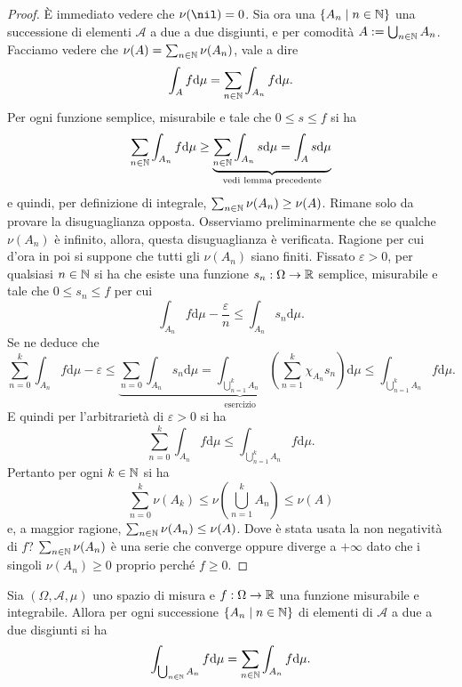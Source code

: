 \begin{proof}
È immediato vedere che \(\nu(\nil) = 0\). Sia ora una \(\left\{A_n \mid n \in \mathbb N\right\}\) una successione di elementi \(\mathcal A\) a due a due disgiunti, e per comodità \(A := \bigcup_{n \in \mathbb N} A_n\). Facciamo vedere che \(\nu (A) = \sum_{n \in \mathbb N} \nu(A_n)\), vale a dire 
\[\int_A f \mathrm d \mu = \sum_{n \in \mathbb N} \int_{A_n} f \mathrm d \mu .\]
Per ogni funzione semplice, misurabile e tale che \(0 \le s \le f\) si ha
\[\sum_{n \in \mathbb N} \int_{A_n} f \mathrm d \mu \ge \underbrace{\sum_{n \in \mathbb N} \int_{A_n} s \mathrm d \mu = \int_A s \mathrm d \mu}_{\text{vedi lemma precedente}}\]
e quindi, per definizione di integrale, \(\sum_{n \in \mathbb N} \nu(A_n) \ge \nu(A)\).\newline
Rimane solo da provare la disuguaglianza opposta. Osserviamo preliminarmente che se qualche \(\nu(A_n)\) è infinito, allora, questa disuguaglianza è verificata. Ragione per cui d'ora in poi si suppone che tutti gli \(\nu(A_n)\) siano finiti. Fissato \(\varepsilon > 0\), per qualsiasi \(n \in \mathbb N\) si ha che esiste una funzione \(s_n : \Omega \to \mathbb R\) semplice, misurabile e tale che \(0 \le s_n \le f\) per cui
\[\int_{A_n} f \mathrm d \mu - \frac \varepsilon n \le \int_{A_n} s_n \mathrm d \mu .\]
Se ne deduce che
\[\sum_{n=0}^k \int_{A_n} f \mathrm d \mu - \varepsilon \le \underbrace{\sum_{n=0} \int_{A_n} s_n \mathrm d \mu = \int_{\bigcup_{n=1}^k A_n} \left( \sum_{n=1}^k \chi_{A_n} s_n \right) \mathrm d \mu}_{\text{esercizio}} \le \int_{\bigcup_{n=1}^k A_n} f \mathrm d \mu .\]
E quindi per l'arbitrarietà di \(\varepsilon > 0\) si ha
\[\sum_{n=0}^k \int_{A_n} f \mathrm d \mu \le \int_{\bigcup_{n=1}^k A_n} f \mathrm d \mu .\]
Pertanto per ogni \(k \in \mathbb N\) si ha
\[\sum_{n=0}^k \nu(A_k) \le \nu\left(\bigcup_{n=1}^k A_n\right) \le \nu(A) \]
e, a maggior ragione, \(\sum_{n \in \mathbb N} \nu(A_n) \le \nu(A)\). Dove è stata usata la non negatività di \(f\)? \(\sum_{n \in \mathbb N} \nu(A_n)\) è una serie che converge oppure diverge a \(+\infty\) dato che i singoli \(\nu(A_n) \ge 0\) proprio perché \(f \ge 0\).
\end{proof}

\begin{corollario}
Sia \((\Omega, \mathcal A, \mu)\) uno spazio di misura e \(f : \Omega \to \mathbb R\) una funzione misurabile e integrabile. Allora per ogni successione \(\left\{A_n \mid n \in \mathbb N\right\}\) di elementi di \(\mathcal A\) a due a due disgiunti si ha
\[\int_{\bigcup_{n \in \mathbb N} A_n} f \mathrm d \mu = \sum_{n \in \mathbb N} \int_{A_n} f \mathrm d \mu .\]
\end{corollario}

